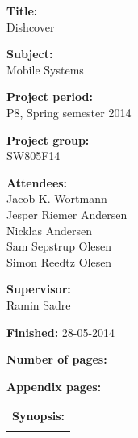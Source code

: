 \begin{titlingpage}
\begin{nopagebreak}
{\noindent\begin{minipage}[c]{0.4\textwidth}
	\begin{flushleft} 
	\begin{description}	
\item {\textbf{Title:}}\\
Dishcover
\item {\textbf{Subject:}}\\
Mobile Systems
\item {\textbf{Project period:}}\\
   P8, Spring semester 2014\\
\item {\textbf{Project group:}}\\
  SW805F14\\
\item {\textbf{Attendees:}}\\
Jacob K. Wortmann \\
Jesper Riemer Andersen \\
Nicklas Andersen \\
Sam Sepstrup Olesen \\
Simon Reedtz Olesen \\

\item {\textbf{Supervisor:}}\\
Ramin Sadre \\
\end{description}

\begin{description}
\item {\textbf{Finished:}} 28-05-2014
\item {\textbf{Number of pages:}} \pageref{lastpage}
\item {\textbf{Appendix pages:}} 
\end{description}
\vfill
	\end{flushleft}
\end{minipage}
\begin{minipage}[c]{0.6\textwidth}
	\begin{flushright} 
		  \vspace{.15cm}
  \hfill 
  \begin{tabular}{l}
  {\textbf{Synopsis:}}\bigskip \\
  \fbox{
    \parbox{5.5cm}{\bigskip
     {\vfill{\small 
     \bigskip}}
     }}
   \end{tabular}
	\end{flushright}
\end{minipage}
\\\\%
}
\end{nopagebreak}
\end{titlingpage}
